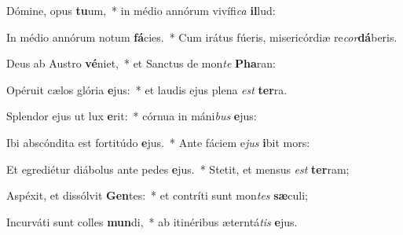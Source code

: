 \item Dómine, opus \textbf{tu}um,~* in médio annórum vivífi\textit{ca} \textbf{il}lud:
\item In médio annórum notum \textbf{fá}cies.~* Cum irátus fúeris, misericórdiæ re\textit{cor}\textbf{dá}beris.
\item Deus ab Austro \textbf{vé}niet,~* et Sanctus de mon\textit{te} \textbf{Pha}ran:
\item Opéruit cælos glória \textbf{e}jus:~* et laudis ejus plena \textit{est} \textbf{ter}ra.
\item Splendor ejus ut lux \textbf{e}rit:~* córnua in máni\textit{bus} \textbf{e}jus:
\item Ibi abscóndita est fortitúdo \textbf{e}jus.~* Ante fáciem e\textit{jus} \textbf{i}bit mors:
\item Et egrediétur diábolus ante pedes \textbf{e}jus.~* Stetit, et mensus \textit{est} \textbf{ter}ram;
\item Aspéxit, et dissólvit \textbf{Gen}tes:~* et contríti sunt mon\textit{tes} \textbf{sæ}culi;
\item Incurváti sunt colles \textbf{mun}di,~* ab itinéribus æterntá\textit{tis} \textbf{e}jus.
